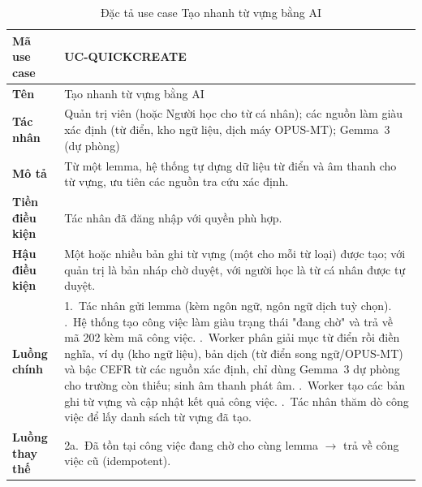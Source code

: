 \begin{table}[H]
  \centering
  \small
  \renewcommand{\arraystretch}{1.3}
  \begin{tabular}{|p{3.0cm}|p{11.4cm}|}
    \hline
    \textbf{Mã use case} & UC-QUICKCREATE \\ \hline
    \textbf{Tên} & Tạo nhanh từ vựng bằng AI \\ \hline
    \textbf{Tác nhân} & Quản trị viên (hoặc Người học cho từ cá nhân); các nguồn làm giàu xác định (từ điển, kho ngữ liệu, dịch máy OPUS-MT); Gemma~3 (dự phòng) \\ \hline
    \textbf{Mô tả} & Từ một lemma, hệ thống tự dựng dữ liệu từ điển và âm thanh cho từ vựng, ưu tiên các nguồn tra cứu xác định. \\ \hline
    \textbf{Tiền điều kiện} & Tác nhân đã đăng nhập với quyền phù hợp. \\ \hline
    \textbf{Hậu điều kiện} & Một hoặc nhiều bản ghi từ vựng (một cho mỗi từ loại) được tạo; với quản trị là bản nháp chờ duyệt, với người học là từ cá nhân được tự duyệt. \\ \hline
    \textbf{Luồng chính} &
      1.~Tác nhân gửi lemma (kèm ngôn ngữ, ngôn ngữ dịch tuỳ chọn). \newline
      2.~Hệ thống tạo công việc làm giàu trạng thái "đang chờ" và trả về mã 202 kèm mã công việc. \newline
      3.~Worker phân giải mục từ điển rồi điền nghĩa, ví dụ (kho ngữ liệu), bản dịch (từ điển song ngữ/OPUS-MT) và bậc CEFR từ các nguồn xác định, chỉ dùng Gemma~3 dự phòng cho trường còn thiếu; sinh âm thanh phát âm. \newline
      4.~Worker tạo các bản ghi từ vựng và cập nhật kết quả công việc. \newline
      5.~Tác nhân thăm dò công việc để lấy danh sách từ vựng đã tạo. \\ \hline
    \textbf{Luồng thay thế} &
      2a.~Đã tồn tại công việc đang chờ cho cùng lemma $\rightarrow$ trả về công việc cũ (idempotent). \\ \hline
  \end{tabular}
  \caption{Đặc tả use case Tạo nhanh từ vựng bằng AI}
  \label{tab:uc-quickcreate}
\end{table}

